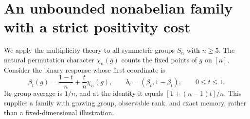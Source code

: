 \section{An unbounded nonabelian family with a strict positivity cost}
\label{sec:r75-symmetric-return}

We apply the multiplicity theory to all symmetric groups $S_n$ with
$n\ge5$. The natural permutation character $\chi_n(g)$ counts the
fixed points of $g$ on $[n]$. Consider the binary response whose first
coordinate is
\begin{equation}\label{eq:r75-symmetric-return}
 \beta_t(g)=\frac{1-t}{n}+\frac{t}{n}\chi_n(g),
 \qquad b_t=(\beta_t,1-\beta_t),\qquad0\le t\le1.
\end{equation}
Its group average is $1/n$, and at the identity it equals
$[1+(n-1)t]/n$. This supplies a family with growing group, observable
rank, and exact memory, rather than a fixed-dimensional illustration.

